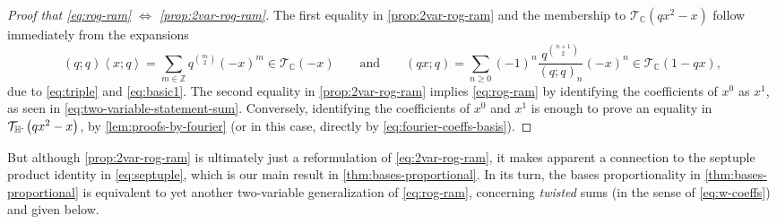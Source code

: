 \documentclass[reqno,11pt]{amsart}
\theoremstyle{definition}
\theoremstyle{remark}
\numberwithin{equation}{section}
\newcommand{\Z}{\mathbb{Z}}
\newcommand{\C}{\mathbb{C}}
\newcommand{\Hminus}{{\mathbb{H}^{\textnormal{-}\hspace{-0.03cm}}}}
\newcommand{\mT}{\mathcal{T}}
\newcommand{\la}{\left\langle}
\newcommand{\ra}{\right\rangle}
\begin{document}
\begin{proof}[Proof that \cref{eq:rog-ram} $\Leftrightarrow$ \cref{prop:2var-rog-ram}]
The first equality in \cref{prop:2var-rog-ram} and the membership to $\mT_\C\left(qx^2 - x\right)$ follow immediately from the expansions
\[
    (q; q)\la x; q\ra = \sum_{m \in \Z} q^{\binom{m}{2}} (-x)^m
    \in \mT_\C(-x)
    \qquad \text{and} \qquad 
    (qx; q) = \sum_{n \ge 0} (-1)^n \frac{q^{\binom{n+1}{2}}}{(q; q)_n} (-x)^n \in \mT_\C(1-qx),
\]
due to \cref{eq:triple} and \cref{eq:basic1}. The second equality in \cref{prop:2var-rog-ram} implies \cref{eq:rog-ram} by identifying the coefficients of $x^0$ as $x^1$, as seen in \cref{eq:two-variable-statement-sum}. Conversely, identifying the coefficients of $x^0$ and $x^1$ is enough to prove an equality in $\mT_\Hminus\left(qx^2 - x\right)$, by \cref{lem:proofs-by-fourier} (or in this case, directly by \cref{eq:fourier-coeffs-basis}).
\end{proof}

But although \cref{prop:2var-rog-ram} is ultimately just a reformulation of \cref{eq:2var-rog-ram}, it makes apparent a connection to the septuple product identity in \cref{eq:septuple}, which is our main result in \cref{thm:bases-proportional}. In its turn, the bases proportionality in \cref{thm:bases-proportional} is equivalent to yet another two-variable generalization of \cref{eq:rog-ram}, concerning \emph{twisted} sums (in the sense of \cref{eq:w-coeffs}) and given below.
\end{document}
